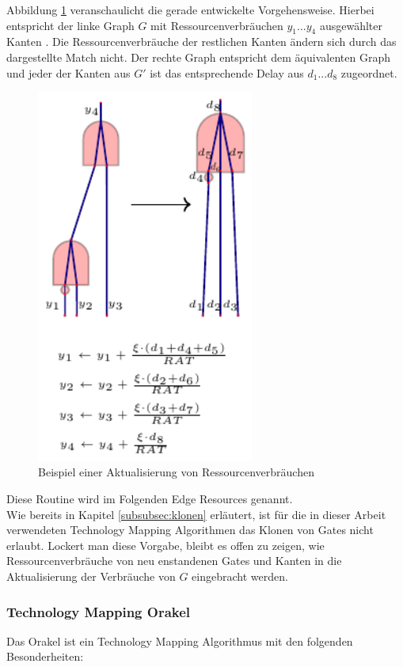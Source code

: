\documentclass[11pt, a4paper, german]{article}
\newcommand{\TM}{Technology  Mapping }
\begin{document}
Abbildung \ref{bild:RS_new_y} veranschaulicht die gerade entwickelte Vorgehensweise. Hierbei entspricht der linke Graph $G$ mit Ressourcenverbräuchen $y_1 ... y_4$ ausgewählter Kanten . Die Ressourcenverbräuche der restlichen Kanten ändern sich durch das dargestellte Match nicht. Der rechte Graph entspricht dem äquivalenten Graph und jeder der Kanten aus $G'$ ist das entsprechende Delay aus $d_1... d_8$ zugeordnet.\\



\begin{figure}[h]
\begin{center}
 \includegraphics[height = 350pt]{./pictures/compiled/RS_new_y}
 \caption{Beispiel einer Aktualisierung von Ressourcenverbräuchen}
 \label{bild:RS_new_y}
\end{center}
\end{figure}

Diese Routine wird im Folgenden Edge Resources genannt.\\
Wie bereits in Kapitel \ref{subsubsec:klonen} erläutert, ist für die in dieser Arbeit verwendeten \TM Algorithmen das Klonen von Gates nicht erlaubt. Lockert man diese Vorgabe, bleibt es offen zu zeigen, wie Ressourcenverbräuche von neu enstandenen Gates und Kanten in die Aktualisierung der Verbräuche von $G$ eingebracht werden. \\

\subsubsection{\TM Orakel}
Das Orakel ist ein \TM Algorithmus mit den folgenden Besonderheiten: \\
\end{document}
